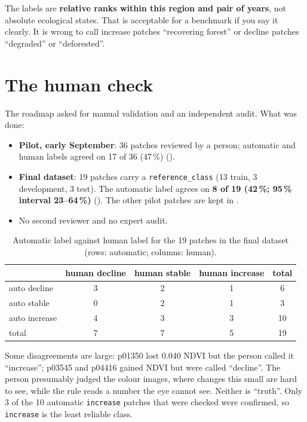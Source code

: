 The labels are \textbf{relative ranks within this region and pair of years}, not absolute ecological states. That is acceptable for a benchmark if you say it clearly. It is wrong to call increase patches ``recovering forest'' or decline patches ``degraded'' or ``deforested''.

\section{The human check}
\label{sec:humanlabels}

The roadmap asked for manual validation and an independent audit. What was done:

\begin{itemize}
  \item \textbf{Pilot, early September}: 36 patches reviewed by a person; automatic and human labels agreed on 17 of 36 (47\,\%) ().
  \item \textbf{Final dataset}: 19 patches carry a \texttt{reference\_class} (13 train, 3 development, 3 test). The automatic label agrees on \textbf{8 of 19 (42\,\%; 95\,\% interval 23--64\,\%)} (). The other pilot patches are kept in .
  \item No second reviewer and no expert audit.
\end{itemize}

\begin{table}[H]
\centering
\caption{Automatic label against human label for the 19 patches in the final dataset (rows: automatic; columns: human).}
\label{tab:humanagree}
\begin{tabular}{lccc|c}
\toprule
 & human decline & human stable & human increase & total \\
\midrule
auto decline & 3 & 2 & 1 & 6 \\
auto stable & 0 & 2 & 1 & 3 \\
auto increase & 4 & 3 & 3 & 10 \\
\midrule
total & 7 & 7 & 5 & 19 \\
\bottomrule
\end{tabular}
\end{table}

Some disagreements are large: p01350 lost 0.040 NDVI but the person called it ``increase''; p03545 and p04416 gained NDVI but were called ``decline''. The person presumably judged the colour images, where changes this small are hard to see, while the rule reads a number the eye cannot see. Neither is ``truth''. Only 3 of the 10 automatic \texttt{increase} patches that were checked were confirmed, so \texttt{increase} is the least reliable class.

